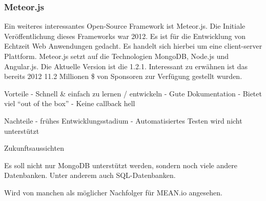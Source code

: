 \subsubsection{Meteor.js}\label{meteor.js}

Ein weiteres interessantes Open-Source Framework ist Meteor.js. Die
Initiale Veröffentlichung dieses Frameworks war 2012. Es ist für die
Entwicklung von Echtzeit Web Anwendungen gedacht. Es handelt sich
hierbei um eine client-server Plattform. Meteor.js setzt auf die
Technologien MongoDB, Node.js und Angular.js. Die Aktuelle Version ist
die 1.2.1. Interessant zu erwähnen ist das bereits 2012 11.2 Millionen
\$ von Sponsoren zur Verfügung gestellt wurden.

Vorteile - Schnell \& einfach zu lernen / entwickeln - Gute
Dokumentation - Bietet viel ``out of the box'' - Keine callback hell

Nachteile - frühes Entwicklungsstadium - Automatisiertes Testen wird
nicht unterstützt

Zukunftsaussichten

Es soll nicht nur MongoDB unterstützt werden, sondern noch viele andere
Datenbanken. Unter anderem auch SQL-Datenbanken.

Wird von manchen als möglicher Nachfolger für MEAN.io angesehen.

